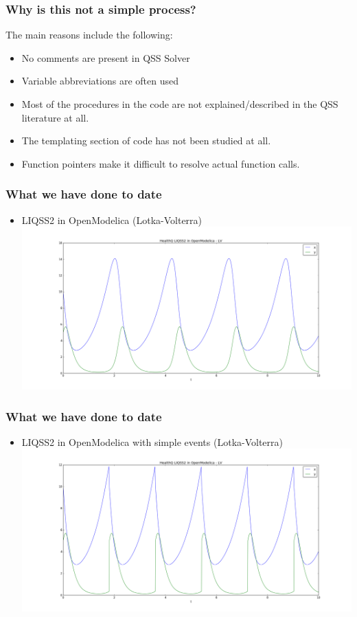 \documentclass[serif,10pt,t]{beamer}
\begin{document}
\begin{frame}\frametitle{Why is this not a simple process?}
 The main reasons include the following:
 \begin{itemize}
  \item No comments are present in QSS Solver
  \item Variable abbreviations are often used
  \item Most of the procedures in the code are not explained/described in the QSS literature at all.
  \item The templating section of code has not been studied at all.
  \item Function pointers make it difficult to resolve actual function calls.
 \end{itemize}
\end{frame}

\begin{frame}\frametitle{What we have done to date}
 \begin{itemize}
  \item LIQSS2 in OpenModelica (Lotka-Volterra)
\includegraphics[scale=0.21]{1-LV.png}

 \end{itemize}

\end{frame}



\begin{frame}\frametitle{What we have done to date}
 \begin{itemize}
  \item LIQSS2 in OpenModelica  with simple events (Lotka-Volterra)
\includegraphics[scale=0.21]{2-LV.png}

 \end{itemize}

\end{frame}
\end{document}
